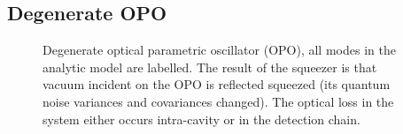 

\subsection{Degenerate OPO}

\begin{figure}
	\centering
	\caption{Degenerate optical parametric oscillator (OPO), all modes in the analytic model are labelled. The result of the squeezer is that vacuum incident on the OPO is reflected squeezed (its quantum noise variances and covariances changed). The optical loss in the system either occurs intra-cavity or in the detection chain.}
	\label{fig:dOPO_config}
\end{figure}

